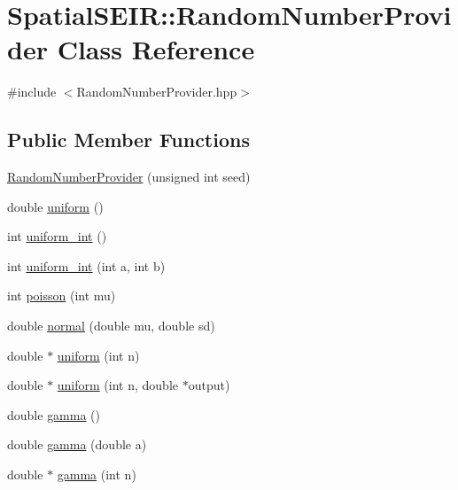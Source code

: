 \hypertarget{classSpatialSEIR_1_1RandomNumberProvider}{\section{Spatial\-S\-E\-I\-R\-:\-:Random\-Number\-Provider Class Reference}
\label{classSpatialSEIR_1_1RandomNumberProvider}
}


{\ttfamily \#include $<$Random\-Number\-Provider.\-hpp$>$}

\subsection*{Public Member Functions}
\begin{DoxyCompactItemize}
\item 
\hyperlink{classSpatialSEIR_1_1RandomNumberProvider_a953b4c73e635b7f85042d0d00fd99455}{Random\-Number\-Provider} (unsigned int seed)
\item 
double \hyperlink{classSpatialSEIR_1_1RandomNumberProvider_ab50138de138ffc3e6cee91a307911ff7}{uniform} ()
\item 
int \hyperlink{classSpatialSEIR_1_1RandomNumberProvider_ae8b533218b2fe1d57ab5cb6fbd9b5e2c}{uniform\-\_\-int} ()
\item 
int \hyperlink{classSpatialSEIR_1_1RandomNumberProvider_abcfeae01f513f89c9b9a7360aaab94b7}{uniform\-\_\-int} (int a, int b)
\item 
int \hyperlink{classSpatialSEIR_1_1RandomNumberProvider_a564c5498596cae055a27024f2083c342}{poisson} (int mu)
\item 
double \hyperlink{classSpatialSEIR_1_1RandomNumberProvider_a06dbed8db603b3c6d8dd6aafba9ab030}{normal} (double mu, double sd)
\item 
double $\ast$ \hyperlink{classSpatialSEIR_1_1RandomNumberProvider_aef9b96cad64f04566b904fbebeac5102}{uniform} (int n)
\item 
double $\ast$ \hyperlink{classSpatialSEIR_1_1RandomNumberProvider_ad90013912f848d37ee7e7cf1a21d65c8}{uniform} (int n, double $\ast$output)
\item 
double \hyperlink{classSpatialSEIR_1_1RandomNumberProvider_aa78c216a74056588b9b6a76d91e84006}{gamma} ()
\item 
double \hyperlink{classSpatialSEIR_1_1RandomNumberProvider_ab1776a59478c4ad2d8699097e91161c0}{gamma} (double a)
\item 
double $\ast$ \hyperlink{classSpatialSEIR_1_1RandomNumberProvider_aa6c39494c6a7bf4cb71177e945b950ee}{gamma} (int n)

\end{DoxyCompactItemize}
